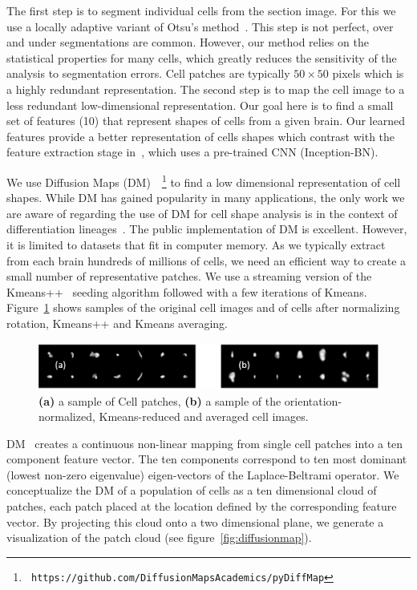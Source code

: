 \documentclass[runningheads]{llncs}
\begin{document}
\begin{enumerate}
The first step is to segment individual cells from the section
image. For this we use a locally adaptive variant of
Otsu's method~\cite{otsu1979threshold}. This step is not perfect, over and under segmentations are
common. However, our method relies on the statistical properties for
many cells, which greatly reduces the sensitivity of the analysis to
segmentation errors. 
Cell patches are typically $50\times 50$ pixels which is a highly
redundant representation. The second step is to
map the cell image to a less redundant low-dimensional representation. Our goal here
is to find a small set of features (10) that represent shapes of cells
from a given brain. Our learned features provide a better representation 
of cells shapes which contrast with the feature extraction stage in~\cite{chen2019active}, 
which uses a pre-trained CNN (Inception-BN). 


We use Diffusion Maps
(DM)~\cite{belkin2003,coifman2005geometric}~\footnote{{\tt
    https://github.com/DiffusionMapsAcademics/pyDiffMap}} to find a
low dimensional representation of cell shapes. While DM has gained
popularity in many applications, the only work we are aware of
regarding the use of DM for cell shape analysis is in the context of
differentiation lineages~\cite{haghverdi2015diffusion}.
The public implementation of DM is excellent. However, it is limited to datasets that
fit in computer memory. As we typically extract from each brain
hundreds of millions of cells, we need an efficient way to create a
small number of representative patches.  We use a streaming version of
the Kmeans++~\cite{arthur2006k} seeding algorithm followed with a few
iterations of Kmeans. Figure~\ref{fig:kmeans} shows samples of the
original cell images and of cells after normalizing
rotation, Kmeans++ and Kmeans averaging.
\begin{figure}[t]
  \includegraphics[width=\textwidth]{Images/CellImages.png}
\caption{{\bf (a)} a sample of Cell patches,
  {\bf (b)}  a sample of the orientation-normalized, Kmeans-reduced and averaged cell images.}
\label{fig:kmeans}
\end{figure}

DM~\cite{coifman2005geometric} creates a continuous
non-linear mapping from single cell patches into a ten component
feature vector. The ten components correspond to ten most dominant
(lowest non-zero eigenvalue) eigen-vectors of the Laplace-Beltrami
operator. We conceptualize the DM of a population of cells as
a ten dimensional cloud of patches, each patch placed at the location
defined by the corresponding feature vector. By projecting this cloud
onto a two dimensional plane, we generate a visualization of the patch
cloud (see figure~\ref{fig:diffusionmap}).


\end{enumerate}
\end{document}
